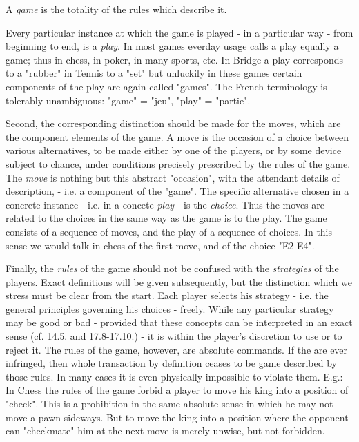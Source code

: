 \begin{definizione}
 A \emph{game} is the totality of the rules which describe it.
\end{definizione}

Every particular instance at which the game is played - in a particular way - from beginning to end, is a \emph{play}. In most games everday usage calls a play equally a game; thus in chess, in poker, in many sports, etc. In Bridge a play corresponds to a "rubber" in Tennis to a "set" but unluckily in these games certain components of the play are again called "games". The French terminology is tolerably unambiguous: "game" = "jeu", "play" = "partie".

Second, the corresponding distinction should be made for the moves, which are the component elements of the game. A move is the occasion of a choice between various alternatives, to be made either by one of the players, or by some device subject to chance, under conditions precisely prescribed by the rules of the game. The \emph{move} is nothing but this abstract "occasion", with the attendant details of description, - i.e. a component of the "game". The specific alternative chosen in a concrete instance - i.e. in a concete \emph{play} - is the \emph{choice}. Thus the moves are related to the choices in the same way as the game is to the play. The game consists of a sequence of moves, and the play of a sequence of choices. In this sense we would talk in chess of the first move, and of the choice "E2-E4".

Finally, the \emph{rules} of the game should not be confused with the \emph{strategies} of the players. Exact definitions will be given subsequently, but the distinction which we stress must be clear from the start. Each player selects his strategy - i.e. the general principles governing his choices - freely. 
While any particular strategy may be good or bad - provided that these concepts can be interpreted in an exact sense (cf. 14.5. and 17.8-17.10.) - it is within the player's discretion to use or to reject it. The rules of the game, however, are absolute commands. If the are ever infringed, then whole transaction by definition ceases to be game described by those rules. In many cases it is even physically impossible to violate them. E.g.: In Chess the rules of the game forbid a player to move his king into a position of "check". This is a prohibition in the same absolute sense in which he may not move a pawn sideways. But to move the king into a position where the opponent can "checkmate" him at the next move is merely unwise, but not forbidden.

